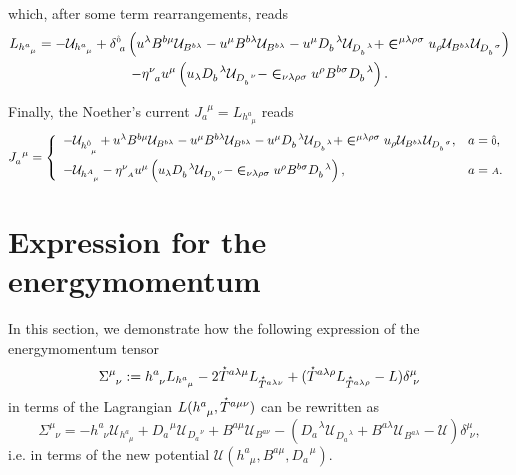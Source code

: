\documentclass[
10pt, %
a4paper, %
oneside, %
headinclude,footinclude, %
BCOR5mm, %
]{scrartcl}
\newcommand{\sA}{\mathsmaller A}
\newcommand{\tetrsymbol}{h}
\newcommand{\itetrsymbol}{\eta}
\newcommand{\itetr}[2]{\itetrsymbol^{#1}_{\phantom{#1}#2}}
\newcommand{\tetr}[2]{\tetrsymbol^{#1}_{\phantom{#1}#2}}
\newcommand{\dT}[2]{D_{#1}^{\phantom{#1}\,#2}}	%
\newcommand{\bT}[2]{B^{#1#2}}	%
\newcommand{\Laghodge}{L}%
\newcommand{\LagST}{\mathcal{U}}%
\newcommand{\EM}[2]{\Sigma^{#1}_{\phantom{#1}#2}}
\newcommand{\LCsymb}{\bm{\in}}    %
\newcommand{\HDT}[1]{\accentset{\star}{T}^{#1}}
\newcommand{\KD}[2]{\delta^{#1}_{\,\,#2}}
\newcommand{\NC}[2]{J^{\phantom{#1}#2}_{#1}}
\newcommand{\indalg}[1]{\hat{\mathsmaller{#1}}}
\begin{document}
which, after some term rearrangements, reads
\begin{multline}\label{eqn.J.BD}
	\Laghodge_{\tetr{a}{\mu}} =
	-\LagST_{\tetr{a}{\mu}}
	+ \KD{\indalg{0}}{a}
	\left( 
	  u^\lambda \bT{b}{\mu} \LagST_{\bT{b}{\lambda}} 
	- u^\mu \bT{b}{\lambda} \LagST_{\bT{b}{\lambda}} 
	- u^\mu \dT{b}{\lambda} \LagST_{\dT{b}{\lambda}}
	+ \LCsymb^{\mu\lambda\rho\sigma} u_\rho \LagST_{\bT{b}{\lambda}}
	\LagST_{\dT{b}{\sigma}} 
	\right) \\
	- \itetr{\nu}{a}u^\mu
	\left(
	u_\lambda \dT{b}{\lambda} \LagST_{\dT{b}{\nu}} 
	- \LCsymb_{\nu\lambda\rho\sigma}u^\rho\bT{b}{\sigma}\dT{b}{\lambda}
	\right).
\end{multline}


Finally, the Noether's current $ \NC{a}{\mu} = \Laghodge_{\tetr{a}{\mu}} $ reads
\begin{equation}
	\NC{a}{\mu} = \left\{
	\begin{array}{ll}
	-\LagST_{\tetr{\indalg{0}}{\mu}}
	+ u^\lambda \bT{b}{\mu} \LagST_{\bT{b}{\lambda}} 
	- u^\mu \bT{b}{\lambda} \LagST_{\bT{b}{\lambda}} 
	- u^\mu \dT{b}{\lambda} \LagST_{\dT{b}{\lambda}}
	+ \LCsymb^{\mu\lambda\rho\sigma} u_\rho \LagST_{\bT{b}{\lambda}}
	\LagST_{\dT{b}{\sigma}},	& a=\indalg{0},  \\[3mm] 
	-\LagST_{\tetr{\sA}{\mu}}	
	- \itetr{\nu}{\sA}u^\mu
	\left(
	u_\lambda \dT{b}{\lambda} \LagST_{\dT{b}{\nu}} 
	- \LCsymb_{\nu\lambda\rho\sigma}u^\rho\bT{b}{\sigma}\dT{b}{\lambda}
	\right), & a = \sA. \\ 
	\end{array} 
	\right.
\end{equation}


\section{Expression for the energymomentum}\label{app.energymomentum}

In this section, we demonstrate how the following expression of the energymomentum tensor
\begin{equation}\label{eqn.EM.hodge}
	\EM{\mu}{\nu} :=
	\tetr{a}{\nu} L_{\tetr{a}{\mu}} - 2 \HDT{a\lambda\mu}L_{\HDT{a\lambda\nu}} + 
	(\HDT{a\lambda\rho}L_{\HDT{a\lambda\rho}} - L) \KD{\mu}{\nu}
\end{equation}
in terms of the Lagrangian $ \Laghodge(\tetr{a}{\mu},\HDT{a\mu\nu}) $ can be rewritten as
\begin{equation}
	\EM{\mu}{\nu} = 
	- \tetr{a}{\nu} \LagST_{\tetr{a}{\mu}}
	+ \dT{a}{\mu}\LagST_{\dT{a}{\nu}} + \bT{a}{\mu}\LagST_{\bT{a}{\nu}}
	- (
	\dT{a}{\lambda}\LagST_{\dT{a}{\lambda}}+ \bT{a}{\lambda}\LagST_{\bT{a}{\lambda}}
	-\LagST
	) \KD{\mu}{\nu},
\end{equation}
i.e. in terms of the new potential $ \LagST(\tetr{a}{\mu},\bT{a}{\mu},\dT{a}{\mu}) $.
\end{document}
